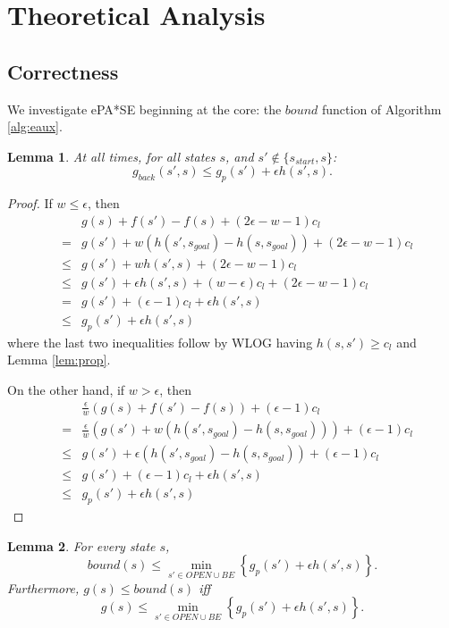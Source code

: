 \documentclass[letterpaper]{article}
\newtheorem{lemma}{Lemma}
\begin{document}
\section{Theoretical Analysis}

\subsection{Correctness}

We investigate ePA*SE beginning at the core: the $bound$ function of Algorithm \ref{alg:eaux}.

\begin{lemma}
\label{lem:indep}
At all times, for all states $s$, and $s'\notin \{s_{start},s\}$:
\[g_{back}(s',s) \le g_p(s') + \epsilon h(s',s).\]
\end{lemma}

\begin{proof}
If $w \le \epsilon$, then
\begin{eqnarray*}
&&g(s) + f(s') - f(s) + (2\epsilon-w-1)c_l
\\&=& g(s') + w(h(s',s_{goal}) - h(s,s_{goal})) + (2\epsilon-w-1)c_l
\\&\le& g(s') + wh(s',s) + (2\epsilon-w-1)c_l
\\&\le& g(s') + \epsilon h(s',s) + (w-\epsilon)c_l + (2\epsilon-w-1)c_l
\\&=& g(s') + (\epsilon-1)c_l + \epsilon h(s',s)
\\&\le& g_p(s') + \epsilon h(s',s)
\end{eqnarray*}
where the last two inequalities follow by WLOG having $h(s,s') \ge c_l$ and Lemma \ref{lem:prop}.

On the other hand, if $w > \epsilon$, then
\begin{eqnarray*}
&&\frac\epsilon w\left(g(s) + f(s') - f(s)\right) + (\epsilon-1)c_l
\\&=& \frac\epsilon w\left(g(s') + w(h(s',s_{goal}) - h(s,s_{goal})) \right) + (\epsilon-1)c_l
\\&\le& g(s') + \epsilon(h(s',s_{goal}) - h(s,s_{goal})) + (\epsilon-1)c_l
\\&\le& g(s') + (\epsilon-1)c_l + \epsilon h(s',s)
\\&\le& g_p(s') + \epsilon h(s',s)
\end{eqnarray*}
\end{proof}

\begin{lemma}
\label{lem:bound}
For every state $s$,
\[bound(s) \le \min_{s'\in OPEN \cup BE} \left\{ g_p(s') + \epsilon h(s',s) \right\}.\]
Furthermore, $g(s) \le bound(s)$ iff
\[g(s) \le \min_{s'\in OPEN \cup BE} \left\{ g_p(s') + \epsilon h(s',s) \right\}.\]
\end{lemma}
\end{document}
